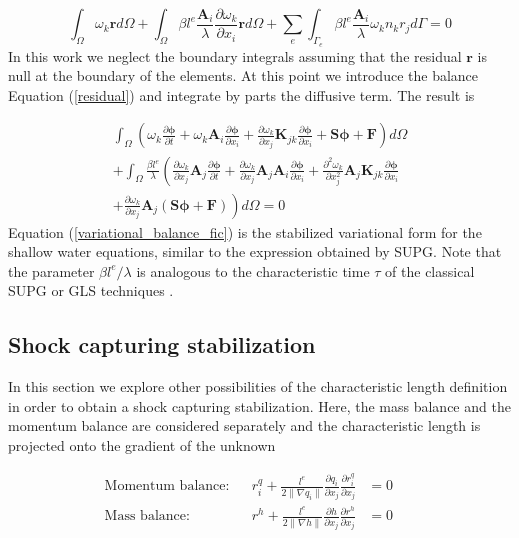 \documentclass[a4paper,12pt]{article}
\newcommand{\pder}[2]{\frac{\partial#1}{\partial#2}}
\newcommand{\ppder}[2]{\frac{\partial^2#1}{\partial#2^2}}
\newcommand{\norm}[1]{\lVert#1\rVert}
\begin{document}
\begin{equation} \label{variational_fic_parts}
\int_\Omega \omega_k \mathbf{r} d\Omega
+ \int_\Omega \beta l^e\frac{\mathbf{A}_i}{\lambda}\pder{\omega_k}{x_i} \mathbf{r} d\Omega
+ \sum_e \int_{\Gamma_e} \beta l^e\frac{\mathbf{A}_i}{\lambda}\omega_kn_kr_j d\Gamma = 0
\end{equation}
In this work we neglect the boundary integrals assuming that the residual $\mathbf{r}$ is null at the boundary of the elements. At this point we introduce the balance Equation (\ref{residual}) and integrate by parts the diffusive term. The result is

\begin{multline} \label{variational_balance_fic}
\int_\Omega \left(
    \omega_k \pder{\bm{\phi}}{t} + \omega_k \mathbf{A}_i\pder{\bm{\phi}}{x_i}
    + \pder{\omega_k}{x_j} \mathbf{K}_{jk} \pder{\bm{\phi}}{x_i} + \mathbf{S}\bm{\phi} + \mathbf{F}
\right) d\Omega\\ +
\int_\Omega \frac{\beta l^e}{\lambda} \left(
    \pder{\omega_k}{x_j} \mathbf{A}_j \pder{\bm{\phi}}{t}
    + \pder{\omega_k}{x_j} \mathbf{A}_j\mathbf{A}_i\pder{\bm{\phi}}{x_i}
    + \ppder{\omega_k}{x_j} \mathbf{A}_j\mathbf{K}_{jk} \pder{\bm{\phi}}{x_i} \right. \\
    \left.
    + \pder{\omega_k}{x_j} \mathbf{A}_j(\mathbf{S}\bm{\phi} + \mathbf{F})
\right) d\Omega
=0
\end{multline}
Equation (\ref{variational_balance_fic}) is the stabilized variational form for the shallow water equations, similar to the expression obtained by SUPG. Note that the parameter $\beta l^e/\lambda$ is analogous to the characteristic time $\tau$ of the classical SUPG or GLS techniques \cite{cotela2016}.

\subsection{Shock capturing stabilization}

In this section we explore other possibilities of the characteristic length definition in order to obtain a shock capturing stabilization. Here, the mass balance and the momentum balance are considered separately and the characteristic length is projected onto the gradient of the unknown

\begin{subequations} \label{eq:shock_capt}
\begin{align}
\text{Momentum balance:} &&
    r_i^q + \frac{l^e}{2\norm{\nabla q_i}}\pder{q_i}{x_j}\pder{r_i^q}{x_j} &= 0 \label{eq:shock_capt_a} && \\ 
\text{Mass balance:} &&
    r^h + \frac{l^e}{2\norm{\nabla h}} \pder{h}{x_j} \pder{r^h}{x_j} &=0 \label{eq:shock_capt_b}
\end{align}
\end{subequations}
\end{document}
